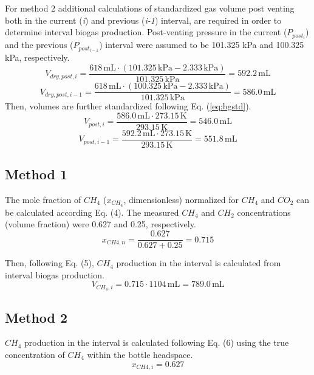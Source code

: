 \documentclass[]{article}
\newcommand{\unit}[1]{\ensuremath{\, \mathrm{#1}}}
\begin{document}
For method 2 additional calculations of standardized gas volume post venting both in the current (\textit{i}) and previous (\textit{i-1}) interval, are required in order to determine interval biogas production. Post-venting pressure in the current ($P_{post_{i}}$) and the previous ($P_{post_{i-1}}$) interval were assumed to be 101.325 kPa and 100.325 kPa, respectively.
\begin{equation*}
   V_{dry,post,i} = \frac{618\unit{mL} \cdot (101.325\unit{kPa} - 2.333\unit{kPa})}{101.325\unit{kPa}} = 592.2\unit{mL}  
\end{equation*}
\begin{equation*}
   V_{dry,post,i-1} = \frac{618\unit{mL} \cdot (100.325\unit{kPa} - 2.333\unit{kPa})}{101.325\unit{kPa}} = 586.0\unit{mL}  
\end{equation*}
Then, volumes are further standardized following Eq. (\ref{eq:bgstd}).
\begin{equation*}
    V_{post,i} = \frac{586.0\unit{mL} \cdot 273.15\unit{K}}{293.15\unit{K}} = 546.0\unit{mL}  
\end{equation*}
\begin{equation*}
    V_{post,i-1} = \frac{592.2\unit{mL} \cdot 273.15\unit{K}}{293.15\unit{K}} = 551.8\unit{mL}  
\end{equation*}

\subsection{Method 1}
The mole fraction of $CH_{4}$ ($x_{CH_4}$, dimensionless) normalized for $CH_{4}$ and $CO_{2}$ can be calculated according Eq. (4). The measured $CH_{4}$ and $CH_{2}$ concentrations (volume fraction) were 0.627 and 0.25, respectively.
\begin{equation*}
    x_{CH{4},n} = \frac{0.627}{0.627 + 0.25} = 0.715
\end{equation*}

Then, following Eq. (5), $CH_{4}$ production in the interval is calculated from interval biogas production.
\begin{equation*}
  V_{CH_4, i} = 0.715 \cdot 1104\unit{mL}  = 789.0\unit{mL} 
\end{equation*}

\subsection{Method 2}
$CH_{4}$  production in the interval is calculated following Eq. (6) using the true concentration of $CH_{4}$ within the bottle headspace.
\begin{equation*}
    x_{CH{4},i} = 0.627
\end{equation*}
\end{document}
